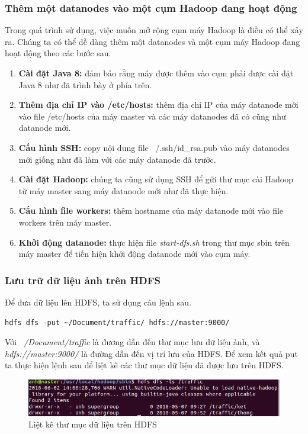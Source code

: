 	\subsubsection{Thêm một datanodes vào một cụm Hadoop đang hoạt động}
	Trong quá trình sử dụng, việc muốn mở rộng cụm máy Hadoop là điều có thể xảy ra. Chúng ta có thể dễ dàng thêm một datanodes và một cụm máy Hadoop đang hoạt động theo các bước sau.
	\begin{enumerate}
		\item \textbf{Cài đặt Java 8: }đảm bảo rằng máy được thêm vào cụm phải được cài đặt Java 8 như đã trình bày ở phía trên.
		\item \textbf{Thêm địa chỉ IP vào /etc/hosts: }thêm địa chỉ IP của máy datanode mới vào file /etc/hosts của máy master và các máy datanodes đã có cũng như datanode mới.
		\item \textbf{Cấu hình SSH: }copy nội dung file ~/.ssh/id\_rsa.pub vào máy datanodes mới giống như đã làm với các máy datanode đã trước.
		\item \textbf{Cài đặt Hadoop: }chúng ta cũng sử dụng SSH để gửi thư mục cài Hadoop từ máy master sang máy datanode mới như đã thực hiện.
		\item \textbf{Cấu hình file workers: }thêm hostname của máy datanode mới vào file workers trên máy master.
		\item \textbf{Khởi động datanode: }thực hiện file \textit{start-dfs.sh} trong thư mục sbin trên máy master để tiến hiện khởi động datanode mới vào cụm máy.
	\end{enumerate}
		
	\subsubsection{Lưu trữ dữ liệu ảnh trên HDFS}
	Để đưa dữ liệu lên HDFS, ta sử dụng câu lệnh sau.
	\begin{lstlisting}
hdfs dfs -put ~/Document/traffic/ hdfs://master:9000/
	\end{lstlisting}
	Với \textit{~/Document/traffic} là đương dẫn đến thư mục lưu dữ liệu ảnh, và \textit{hdfs://master:9000/} là đường dẫn đến vị trí lưu của HDFS. Để xem kết quả put ta thực hiện lệnh sau để liệt kê các thư mục dữ liệu đã được lưu trên HDFS.
	\begin{figure}[h!]
				\centering
				\includegraphics[scale=0.6]{charts/dfs-ls.png}
				\caption{Liệt kê thư mục dữ liệu trên HDFS}
				\label{fig:dfs-ls}
	\end{figure}
	
